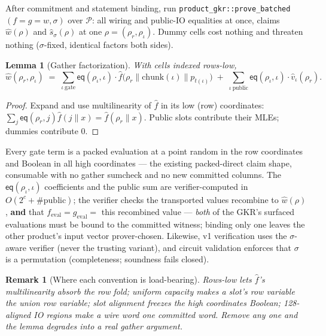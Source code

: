 \documentclass[11pt]{article}
\newcommand{\eq}{\mathsf{eq}}
\newcommand{\code}[1]{\texttt{#1}}
\newcommand{\cells}{\mathcal{P}}
\newtheorem{lemma}{Lemma}
\newtheorem{remark}{Remark}
\theoremstyle{definition}
\begin{document}
After commitment and statement binding, run
\code{product\_gkr::prove\_batched}$(f{=}g{=}w, \sigma)$ over $\cells$:
all wiring and public-IO equalities at once, claims $\hat w(\rho)$ and
$\hat s_\sigma(\rho)$ at one $\rho = (\rho_r, \rho_\iota)$. Dummy cells
cost nothing and threaten nothing ($\sigma$-fixed, identical factors both
sides).

\begin{lemma}[Gather factorization]\label{lem:gather}
With cells indexed rows-low,
\[
  \hat w(\rho_r, \rho_\iota)
  \;=\;
  \sum_{\iota\ \mathrm{gate}} \eq(\rho_\iota, \iota)\cdot
     \hat f\bigl(\rho_r \| \mathrm{chunk}(\iota) \| p_{t(\iota)}\bigr)
  \;+\;
  \sum_{\iota\ \mathrm{public}} \eq(\rho_\iota, \iota)\cdot
     \hat v_\iota(\rho_r).
\]
\end{lemma}

\begin{proof}
Expand and use multilinearity of $\hat f$ in its low (row) coordinates:
$\sum_j \eq(\rho_r, j) \hat f(j \| x) = \hat f(\rho_r \| x)$. Public slots
contribute their MLEs; dummies contribute 0.
\end{proof}

Every gate term is a packed evaluation at a point random in the row
coordinates and Boolean in all high coordinates --- the existing
packed-direct claim shape, consumable with no gather sumcheck and no new
committed columns. The $\eq(\rho_\iota, \iota)$ coefficients and the
public sum are verifier-computed in $O(2^c + \#\mathrm{public})$; the
verifier checks the transported values recombine to $\hat w(\rho)$,
\textbf{and} that
$f_{\mathrm{eval}} = g_{\mathrm{eval}} = $ this recombined value ---
\emph{both} of the GKR's surfaced evaluations must be bound to the
committed witness; binding only one leaves the other product's input
vector prover-chosen. Likewise, v1 verification uses the $\sigma$-aware
verifier (never the trusting variant), and circuit validation enforces
that $\sigma$ is a permutation (completeness; soundness fails closed).

\begin{remark}[Where each convention is load-bearing]
Rows-low lets $\hat f$'s multilinearity absorb the row fold; uniform
capacity makes a slot's row variable the union row variable; slot
alignment freezes the high coordinates Boolean; 128-aligned IO regions
make a wire word one committed word. Remove any one and the lemma degrades
into a real gather argument.
\end{remark}
\end{document}
